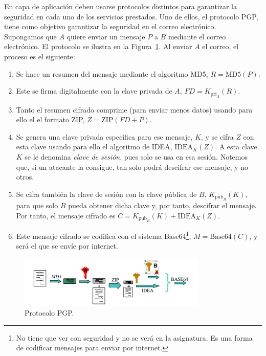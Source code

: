 En capa de aplicación deben usarse protocolos distintos para garantizar la seguridad en cada uno de los servicios prestados. Uno de ellos, el protocolo \acrfull{PGP}, tiene como objetivo garantizar la seguridad en el correo electrónico.\\

Supongamos que $A$ quiere enviar un mensaje $P$ a $B$ mediante el correo electrónico. El protocolo se ilustra en la Figura~\ref{fig:pgp}.
Al enviar $A$ el correo, el proceso es el siguiente:
\begin{enumerate}
    \item Se hace un resumen del mensaje mediante el algoritmo \acrshort{MD5}, $R=\text{MD5}(P)$.
    \item Este se firma digitalmente con la clave privada de $A$, $FD=K_{\text{pri}_A}(R)$.
    \item Tanto el resumen cifrado comprime (para enviar menos datos) usando para ello el el formato ZIP\@, $Z=\text{ZIP}(FD+P)$.
    \item Se genera una clave privada específica para ese mensaje, $K$, y se cifra $Z$ con esta clave usando para ello el algoritmo de \acrshort{IDEA}, $\text{IDEA}_K(Z)$.  A esta clave $K$ se le denomina \emph{clave de sesión}, pues solo se usa en esa sesión. Notemos que, si un atacante la consigue, tan solo podrá descifrar ese mensaje, y no otros.
    \item Se cifra también la clave de sesión con la clave pública de $B$, $K_{\text{pub}_B}(K)$, para que solo $B$ pueda obtener dicha clave y, por tanto, descifrar el mensaje. Por tanto, el mensaje cifrado es $C=K_{\text{pub}_B}(K)+\text{IDEA}_K(Z)$.
    \item Este mensaje cifrado se codifica con el sistema Base64\footnote{No tiene que ver con seguridad y no se verá en la asignatura. Es una forma de codificar mensajes para enviar por internet.}, $M=\text{Base64}(C)$,
    y será el que se envíe por internet.
\end{enumerate}
\begin{figure}
    \centering
    \includegraphics[width=0.8\textwidth]{images/pgp.jpeg}
    \caption{Protocolo \acrshort{PGP}.}
    \label{fig:pgp}
\end{figure}


